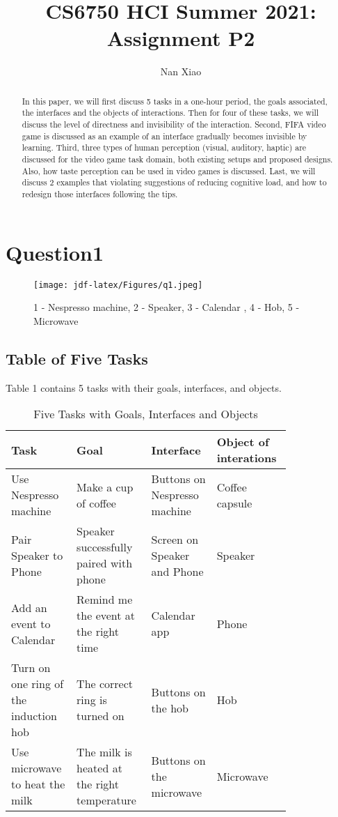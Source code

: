 \documentclass[
	letterpaper, %
]{jdf}
\author{Nan Xiao}
\title{CS6750 HCI Summer 2021:\\Assignment P2}
\begin{document}

\maketitle

\begin{abstract}
	In this paper, we will first discuss 5 tasks in a one-hour period, the goals associated, the interfaces and the objects of interactions. Then for four of these tasks, we will discuss the level of directness and invisibility of the interaction. Second, FIFA video game is discussed as an example of an interface gradually becomes invisible by learning. Third, three types of human perception (visual, auditory, haptic) are discussed for the video game task domain, both existing setups and proposed designs. Also, how taste perception can be used in video games is discussed. Last, we will discuss 2 examples that violating suggestions of reducing cognitive load, and how to redesign those interfaces following the tips.
\end{abstract}

\section{Question1}
\begin{figure}[h]
	\centering
	\texttt{[image: jdf-latex/Figures/q1.jpeg]}
	\caption{1 - Nespresso machine, 2 - Speaker, 3 - Calendar , 4 - Hob, 5 - Microwave}
	\label{fig:q1}
\end{figure}

\subsection{Table of Five Tasks}
Table 1 contains 5 tasks with their goals, interfaces, and objects.
\begin{table}[h] %
	\caption{Five Tasks with Goals, Interfaces and Objects}
	\small %
	\centering %
	\begin{tabular}{L{0.2\linewidth} L{0.2\linewidth} L{0.2\linewidth} L{0.2\linewidth}}
		\textbf{Task} & \textbf{Goal} & \textbf{Interface} & \textbf{Object of interations}\\
		\toprule[0.5pt]
		Use Nespresso machine & Make a cup of coffee & Buttons on Nespresso machine & Coffee capsule\\
		\midrule
		Pair Speaker to Phone & Speaker successfully paired with phone & Screen on Speaker and Phone & Speaker \\
		\midrule
		Add an event to Calendar & Remind me the event at the right time & Calendar app & Phone \\
		\midrule
		Turn on one ring of the induction hob & The correct ring is turned on & Buttons on the hob & Hob \\
		\midrule
		Use microwave to heat the milk & The milk is heated at the right temperature & Buttons on the microwave & Microwave \\
	\end{tabular}
\end{table}
\end{document}
